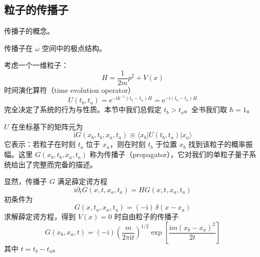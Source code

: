 \subsection{粒子的传播子}

\begin{keypoints}
\item 传播子的概念。
\item 传播子在 $\omega$ 空间中的极点结构。
\end{keypoints}

考虑一个一维粒子：
\begin{equation*}
H = \frac{1}{2m}p^2 + V(x) \tag{2.1.1}
\end{equation*}
时间演化算符（time evolution operator）
\begin{equation*}
U(t_b,t_a) = \mathrm{e}^{-\mathrm{i}\hbar^{-1}(t_b-t_a)H} = \mathrm{e}^{-\mathrm{i}(t_b-t_a)H}
\end{equation*}
完全决定了系统的行为与性质。本节中我们总假定 $t_b > t_a$。全书我们取 $\hbar = 1$。

$U$ 在坐标基下的矩阵元为
\begin{equation*}
\mathrm{i}G(x_b,t_b,x_a,t_a) \equiv \langle x_b|U(t_b,t_a)|x_a\rangle
\end{equation*}
它表示：若粒子在时刻 $t_a$ 位于 $x_a$，则在时刻 $t_b$ 于位置 $x_b$ 找到该粒子的概率振幅。这里 $G(x_b,t_b,x_a,t_a)$ 称为传播子（propagator），它对我们的单粒子量子系统给出了完整而完备的描述。

显然，传播子 $G$ 满足薛定谔方程
\begin{equation*}
\mathrm{i}\partial_t G(x,t,x_a,t_a) = H G(x,t,x_a,t_a)
\end{equation*}
初条件为
\begin{equation*}
G(x,t_a,x_a,t_a) = (-\mathrm{i})\,\delta(x-x_a)
\end{equation*}
求解薛定谔方程，得到 $V(x)=0$ 时自由粒子的传播子
\begin{equation*}
G(x_b,x_a,t) = (-\mathrm{i})\left(\frac{m}{2\pi\mathrm{i}t}\right)^{1/2} \exp\left[\frac{\mathrm{i}m(x_b-x_a)^2}{2t}\right] \tag{2.1.2}
\end{equation*}
其中 $t = t_b - t_a$。

